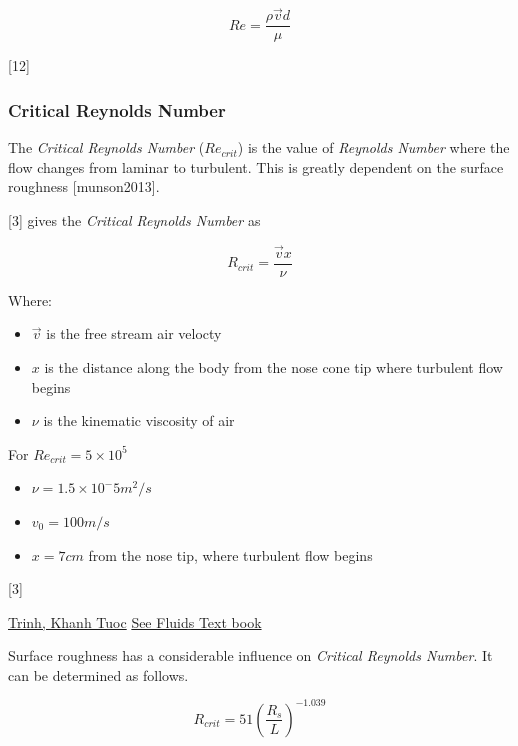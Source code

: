 \documentclass[]{article}
\providecommand{\tightlist}{%
  \setlength{\itemsep}{0pt}\setlength{\parskip}{0pt}}
\begin{document}
\begin{equation}
\label{eq_reynolds_number_theory}
Re = \dfrac{\rho \vec{v} d}{\mu}
\end{equation}

{[}12{]}

\subsubsection{Critical Reynolds Number}\label{critical-reynolds-number}

The \emph{Critical Reynolds Number} (\(Re_{crit}\)) is the value of
\emph{Reynolds Number} where the flow changes from laminar to turbulent.
This is greatly dependent on the surface roughness {[}munson2013{]}.

{[}3{]} gives the \emph{Critical Reynolds Number} as

\begin{equation}
\label{eq_reynolds_number_critical}
R_{crit} = \dfrac{\vec{v} x} {\nu}
\end{equation}

Where:

\begin{itemize}
\tightlist
\item
  \(\vec{v}\) is the free stream air velocty
\item
  \(x\) is the distance along the body from the nose cone tip where
  turbulent flow begins
\item
  \(\nu\) is the kinematic viscosity of air
\end{itemize}

For \(Re_{crit} = 5 \times 10^5\)

\begin{itemize}
\tightlist
\item
  \(\nu = 1.5 \times 10^-5 m^2/s\)
\item
  \(v_0 = 100 m/s\)
\item
  \(x = 7 cm\) from the nose tip, where turbulent flow begins
\end{itemize}

{[}3{]}

\href{http://arxiv.org/ftp/arxiv/papers/1007/1007.0810.pdf}{Trinh, Khanh
Tuoc} \href{fluids\%20textbook}{See Fluids Text book}

Surface roughness has a considerable influence on \emph{Critical
Reynolds Number}. It can be determined as follows.

\begin{equation}
\label{eq_reynolds_number_critical_roughness}
R_{crit} = 51 \left( \dfrac{R_s}{L} \right)^{-1.039}
\end{equation}
\end{document}
